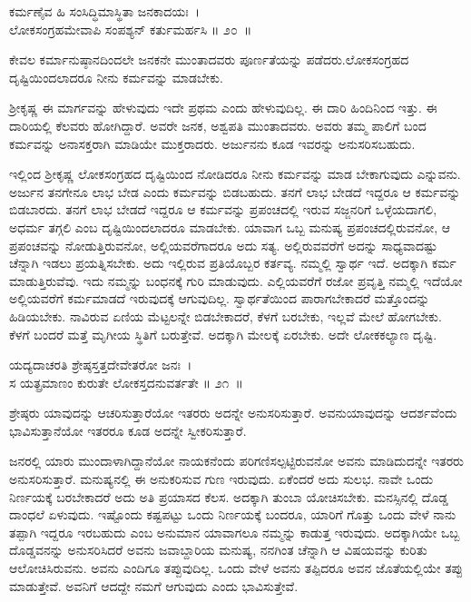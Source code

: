 \begin{shloka}
ಕರ್ಮಣೈವ ಹಿ ಸಂಸಿದ್ಧಿಮಾಸ್ಥಿತಾ ಜನಕಾದಯಃ~।\\ಲೋಕಸಂಗ್ರಹಮೇವಾಪಿ ಸಂಪಶ್ಯನ್ ಕರ್ತುಮರ್ಹಸಿ \hfill॥ ೨೦~॥
\end{shloka}

\begin{artha}
ಕೇವಲ ಕರ್ಮಾನುಷ್ಠಾನದಿಂದಲೇ ಜನಕನೇ ಮುಂತಾದವರು ಪೂರ್ಣತೆಯನ್ನು ಪಡೆದರು.\break ಲೋಕಸಂಗ್ರಹದ ದೃಷ್ಟಿಯಿಂದಲಾದರೂ ನೀನು ಕರ್ಮವನ್ನು ಮಾಡಬೇಕು.
\end{artha}

ಶ‍್ರೀಕೃಷ್ಣ ಈ ಮಾರ್ಗವನ್ನು ಹೇಳುವುದು ಇದೇ ಪ್ರಥಮ ಎಂದು ಹೇಳುವುದಿಲ್ಲ. ಈ ದಾರಿ ಹಿಂದಿನಿಂದ ಇತ್ತು. ಈ ದಾರಿಯಲ್ಲಿ ಕೆಲವರು ಹೋಗಿದ್ದಾರೆ. ಅವರೇ ಜನಕ, ಅಶ್ವಪತಿ ಮುಂತಾದವರು. ಅವರು ತಮ್ಮ ಪಾಲಿಗೆ ಬಂದ ಕರ್ಮವನ್ನು ಅನಾಸಕ್ತರಾಗಿ ಮಾಡಿಯೇ ಮುಕ್ತರಾದರು. ಅರ್ಜುನನು ಕೂಡ ಇವರನ್ನು ಅನುಸರಿಸಬಹುದು.

ಇಲ್ಲಿಂದ ಶ‍್ರೀಕೃಷ್ಣ ಲೋಕಸಂಗ್ರಹದ ದೃಷ್ಟಿಯಿಂದ ನೋಡಿದರೂ ನೀನು ಕರ್ಮವನ್ನು ಮಾಡ ಬೇಕಾಗುವುದು ಎನ್ನುವನು. ಅರ್ಜುನ ತನಗೇನೂ ಲಾಭ ಬೇಡ ಎಂದು ಕರ್ಮವನ್ನು ಬಿಡಬಹುದು. ತನಗೆ ಲಾಭ ಬೇಡದೆ ಇದ್ದರೂ ಆ ಕರ್ಮವನ್ನು ಬಿಡಬಾರದು. ತನಗೆ ಲಾಭ ಬೇಡದೆ ಇದ್ದರೂ ಆ ಕರ್ಮವನ್ನು ಪ್ರಪಂಚದಲ್ಲಿ ಇರುವ ಸಜ್ಜನರಿಗೆ ಒಳ್ಳೆಯದಾಗಲಿ, ಅಧರ್ಮ ತಗ್ಗಲಿ ಎಂಬ ದೃಷ್ಟಿಯಿಂದಲಾದರೂ ಮಾಡಬೇಕು. ಯಾವಾಗ ಒಬ್ಬ ಮನುಷ್ಯ ಪ್ರಪಂಚದಲ್ಲಿರುವನೋ, ಆ ಪ್ರಪಂಚವನ್ನು ನೋಡುತ್ತಿರುವನೋ, ಅಲ್ಲಿಯವರೆಗಾದರೂ ಅದು ಸತ್ಯ. ಅಲ್ಲಿರುವವರೆಗೆ ಅದನ್ನು ಸಾಧ್ಯವಾದಷ್ಟು ಚೆನ್ನಾಗಿ ಇಡಲು ಪ್ರಯತ್ನಿಸಬೇಕು. ಅದು ಇಲ್ಲಿರುವ ಪ್ರತಿಯೊಬ್ಬರ ಕರ್ತವ್ಯ. ನಮ್ಮಲ್ಲಿ ಸ್ವಾರ್ಥ ಇದೆ. ಅದಕ್ಕಾಗಿ ಕರ್ಮ ಮಾಡುತ್ತಿರುವೆವು. ಇದು ನಮ್ಮನ್ನು ಬಂಧನಕ್ಕೆ ಗುರಿ ಮಾಡುವುದು. ಎಲ್ಲಿಯವರೆಗೆ ರಜೋ ಪ್ರವೃತ್ತಿ ನಮ್ಮಲ್ಲಿ ಇದೆಯೋ ಅಲ್ಲಿಯವರೆಗೆ ಕರ್ಮಮಾಡದೆ ಇರುವುದಕ್ಕೆ ಆಗುವುದಿಲ್ಲ. ಸ್ವಾರ್ಥತೆಯಿಂದ ಪಾರಾಗಬೇಕಾದರೆ ಮತ್ತೊಂದನ್ನು ಹಿಡಿಯಬೇಕು. ನಾವಿರುವ ಏಣಿಯ ಮೆಟ್ಟಲನ್ನೇ ಬಿಡಬೇಕಾದರೆ, ಕೆಳಗೆ ಬರಬೇಕು, ಇಲ್ಲವೆ ಮೇಲೆ ಹೋಗಬೇಕು. ಕೆಳಗೆ ಬಂದರೆ ಮತ್ತೆ ಮೃಗೀಯ ಸ್ಥಿತಿಗೆ ಬರುತ್ತೇವೆ. ಅದಕ್ಕಾಗಿ ಮೇಲಕ್ಕೆ ಏರಬೇಕು. ಅದೇ ಲೋಕಕಲ್ಯಾಣ ದೃಷ್ಟಿ.

\begin{shloka}
ಯದ್ಯದಾಚರತಿ ಶ್ರೇಷ್ಠಸ್ತತ್ತದೇವೇತರೋ ಜನಃ~।\\ಸ ಯತ್ಪ್ರಮಾಣಂ ಕುರುತೇ ಲೋಕಸ್ತದನುವರ್ತತೇ \hfill॥ ೨೧~॥
\end{shloka}

\begin{artha}
ಶ್ರೇಷ್ಠರು ಯಾವುದನ್ನು ಆಚರಿಸುತ್ತಾರೆಯೋ ಇತರರು ಅದನ್ನೇ ಅನುಸರಿಸುತ್ತಾರೆ. ಅವನು\break ಯಾವುದನ್ನು ಆದರ್ಶವೆಂದು ಭಾವಿಸುತ್ತಾನೆಯೋ ಇತರರೂ ಕೂಡ ಅದನ್ನೇ ಸ್ವೀಕರಿಸುತ್ತಾರೆ.
\end{artha}

ಜನರಲ್ಲಿ ಯಾರು ಮುಂದಾಳಾಗಿದ್ದಾನೆಯೋ ನಾಯಕನೆಂದು ಪರಿಗಣಿಸಲ್ಪಟ್ಟಿರುವನೋ ಅವನು ಮಾಡಿದುದನ್ನೇ ಇತರರು ಅನುಸರಿಸುತ್ತಾರೆ. ಮನುಷ್ಯನಲ್ಲಿ ಈ ಅನುಕರಿಸುವ ಗುಣ ಇರುವುದು. ಏಕೆಂದರೆ ಅದು ಸುಲಭ. ನಾವೇ ಒಂದು ನಿರ್ಣಯಕ್ಕೆ ಬರಬೇಕಾದರೆ ಅದು ಅತಿ ಪ್ರಯಾಸದ ಕೆಲಸ. ಅದಕ್ಕಾಗಿ ತುಂಬಾ ಯೋಚಿಸಬೇಕು. ಮನಸ್ಸಿನಲ್ಲಿ ದೊಡ್ಡ ದಾಂಧಲೆ ಏಳುವುದು. ಇಷ್ಟೊಂದು ಕಷ್ಟಪಟ್ಟು ಒಂದು ನಿರ್ಣಯಕ್ಕೆ ಬಂದರೂ, ಯಾರಿಗೆ ಗೊತ್ತು ಒಂದು ವೇಳೆ ನಾನು ತಪ್ಪಾಗಿ ಇದ್ದರೂ ಇರಬಹುದು ಎಂಬ ಅನುಮಾನ ಯಾವಾಗಲೂ ನಮ್ಮನ್ನು ಕಾಡುತ್ತ ಇರುವುದು. ಅದಕ್ಕಾಗಿಯೇ ಒಬ್ಬ ದೊಡ್ಡವನನ್ನು ಅನುಸರಿಸಿದರೆ ಅವನು ಜವಾಬ್ದಾರಿಯ ಮನುಷ್ಯ, ನನಗಿಂತ ಚೆನ್ನಾಗಿ ಆ ವಿಷಯವನ್ನು ಕುರಿತು ಆಲೋಚಿಸಿರುವನು. ಅವನು ಎಂದಿಗೂ ತಪ್ಪುವುದಿಲ್ಲ. ಒಂದು ವೇಳೆ ಅವನು ತಪ್ಪಿದರೂ ಅವನ ಜೊತೆಯಲ್ಲಿಯೇ ತಪ್ಪು ಮಾಡುತ್ತೇವೆ. ಅವನಿಗೆ ಆದದ್ದೇ ನಮಗೆ ಆಗುವುದು ಎಂದು ಭಾವಿಸುತ್ತೇವೆ.

